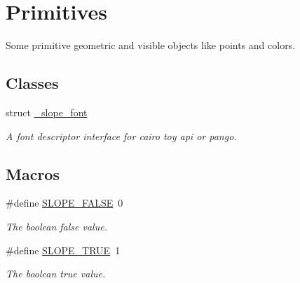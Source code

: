 \hypertarget{group__Primitives}{\section{Primitives}
\label{group__Primitives}
}


Some primitive geometric and visible objects like points and colors.  


\subsection*{Classes}
\begin{DoxyCompactItemize}
\item 
struct \hyperlink{struct__slope__font}{\+\_\+slope\+\_\+font}
\begin{DoxyCompactList}\small\item\em A font descriptor interface for cairo toy api or pango. \end{DoxyCompactList}\end{DoxyCompactItemize}
\subsection*{Macros}
\begin{DoxyCompactItemize}
\item 
\hypertarget{group__Primitives_gae6284087e258abab2709107da8deef10}{\#define \hyperlink{group__Primitives_gae6284087e258abab2709107da8deef10}{S\+L\+O\+P\+E\+\_\+\+F\+A\+L\+S\+E}~0}\label{group__Primitives_gae6284087e258abab2709107da8deef10}

\begin{DoxyCompactList}\small\item\em The boolean false value. \end{DoxyCompactList}\item 
\hypertarget{group__Primitives_gaf4724331c7139c35a340ef6c34d1d5b8}{\#define \hyperlink{group__Primitives_gaf4724331c7139c35a340ef6c34d1d5b8}{S\+L\+O\+P\+E\+\_\+\+T\+R\+U\+E}~1}\label{group__Primitives_gaf4724331c7139c35a340ef6c34d1d5b8}

\begin{DoxyCompactList}\small\item\em The boolean true value. \end{DoxyCompactList}\end{DoxyCompactItemize}
